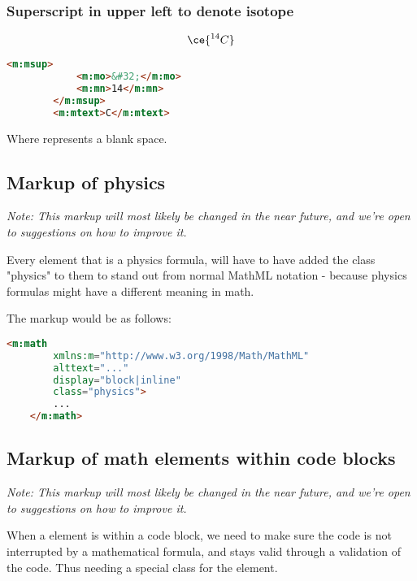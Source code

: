 \documentclass[english,a4paper,11pt]{article}
\begin{document}
\subsubsection{Superscript in upper left to denote isotope}\label{chemistry-isotope}

\begin{eksempler}
	\begin{equation}
		\ce{^{14}C}
	\end{equation}
	\begin{lstlisting}[language=HTML]
		<m:msup>
			<m:mo>&#32;</m:mo>
			<m:mn>14</m:mn>
		</m:msup>
		<m:mtext>C</m:mtext>
	\end{lstlisting}
	Where  represents a blank space.
\end{eksempler}

\subsection{Markup of physics}\label{physics}

\textit{Note: This markup will most likely be changed in the near future, and we're open to suggestions on how to improve it.}

Every  element that is a physics formula, will have to have added the class "physics" to them to stand out from normal MathML notation - because physics formulas might have a different meaning in math.

\begin{eksempler}
The markup would be as follows:
\begin{lstlisting}[language=HTML]
	<m:math 
	    xmlns:m="http://www.w3.org/1998/Math/MathML"
	    alttext="..."
	    display="block|inline"
		class="physics">
		...
	</m:math>
\end{lstlisting}
\end{eksempler}

\subsection{Markup of math elements within code blocks}

\textit{Note: This markup will most likely be changed in the near future, and we're open to suggestions on how to improve it.}

When a  element is within a code block, we need to make sure the code is not interrupted by a mathematical formula, and stays valid through a validation of the code. Thus needing a special class for the  element.
\end{document}
